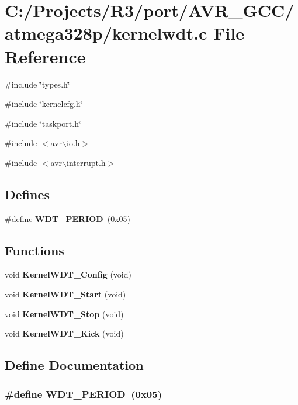 \section{C:/Projects/R3/port/AVR\_\-GCC/atmega328p/kernelwdt.c File Reference}
\label{kernelwdt_8c}
{\ttfamily \#include \char`\"{}types.h\char`\"{}}\par
{\ttfamily \#include \char`\"{}kernelcfg.h\char`\"{}}\par
{\ttfamily \#include \char`\"{}taskport.h\char`\"{}}\par
{\ttfamily \#include $<$avr$\backslash$io.h$>$}\par
{\ttfamily \#include $<$avr$\backslash$interrupt.h$>$}\par
\subsection*{Defines}
\begin{DoxyCompactItemize}
\item 
\#define {\bf WDT\_\-PERIOD}~(0x05)
\end{DoxyCompactItemize}
\subsection*{Functions}
\begin{DoxyCompactItemize}
\item 
void {\bf KernelWDT\_\-Config} (void)
\item 
void {\bf KernelWDT\_\-Start} (void)
\item 
void {\bf KernelWDT\_\-Stop} (void)
\item 
void {\bf KernelWDT\_\-Kick} (void)
\end{DoxyCompactItemize}


\subsection{Define Documentation}
\subsubsection[{WDT\_\-PERIOD}]{\setlength{\rightskip}{0pt plus 5cm}\#define WDT\_\-PERIOD~(0x05)}\label{kernelwdt_8c_abfd81fe656b5b7eff16ce10e1aa376c2}


